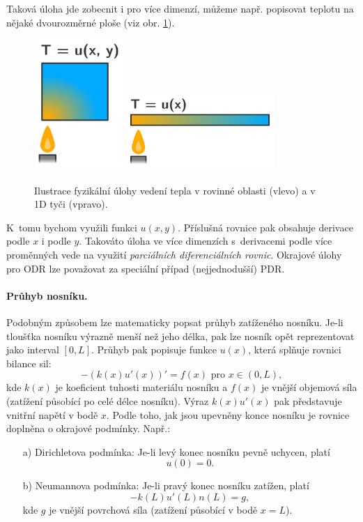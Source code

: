 Taková úloha jde zobecnit i pro více dimenzí, můžeme např. popisovat
teplotu na nějaké dvourozměrné ploše (viz obr. \ref{fig:heat}).
\begin{figure}
\centering
\includegraphics[width=0.3\textwidth]{img/image3.png}%
\includegraphics[width=0.5\textwidth]{img/image5.png}
\caption{Ilustrace fyzikální úlohy vedení tepla v rovinné oblasti (vlevo) a v 1D tyči (vpravo).}
\label{fig:heat}
\end{figure}
K~tomu bychom využili funkci
$u(x, y)$. Příslušná rovnice pak obsahuje derivace podle $x$ i
podle $y$. Takováto úloha ve více dimenzích s~derivacemi podle více
proměnných vede na využití \emph{parciálních diferenciálních rovnic}.
Okrajové úlohy pro ODR lze považovat za speciální případ (nejjednodušší) PDR.


\paragraph{Průhyb nosníku.}
Podobným způsobem lze matematicky popsat průhyb zatíženého nosníku.
Je-li tloušťka nosníku výrazně menší než jeho délka, pak lze nosník opět reprezentovat jako interval $[0,L]$.
Průhyb pak popisuje funkce $u(x)$, která splňuje rovnici bilance sil:
\[ -(k(x)u'(x))' = f(x) \mbox{ pro }x\in(0,L), \]
kde $k(x)$ je koeficient tuhosti materiálu nosníku a $f(x)$ je vnější objemová síla (zatížení působící po celé délce nosníku).
Výraz $k(x)u'(x)$ pak představuje vnitřní napětí v bodě $x$.
Podle toho, jak jsou upevněny konce nosníku je rovnice doplněna o okrajové podmínky. Např.:
\begin{enumerate}
\item[a)] Dirichletova podmínka: Je-li levý konec nosníku pevně uchycen, platí
\[ u(0)=0. \]
\item[b)] Neumannova podmínka: Je-li pravý konec nosníku zatížen, platí
\[ -k(L)u'(L)n(L) = g, \]
kde $g$ je vnější povrchová síla (zatížení působící v bodě $x=L$).
\end{enumerate}

